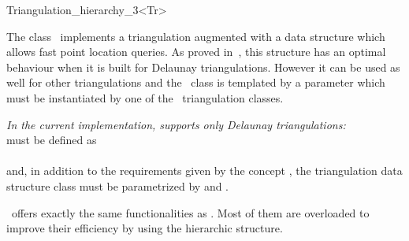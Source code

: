 

\begin{ccRefClass}{Triangulation_hierarchy_3<Tr>}

\ccDefinition
The class \ccRefName\ implements a triangulation augmented with
a data structure which allows fast point location queries.
As proved in~\cite{d-iirdt-98}, this structure has an optimal behaviour
when it is built for Delaunay triangulations.
However it can be used as well for other triangulations
and the \ccRefName\ class is templated by a parameter
which must be instantiated by one of the \cgal\ triangulation
classes.

\textit{In the current implementation,  
supports only Delaunay triangulations:}\\
 must be defined as\\
\\
and, in addition to the requirements given by the concept
, the triangulation data structure
class must be parametrized by 
and .


\ccInheritsFrom


\ccRefName\ offers exactly the same functionalities as .
Most of them are overloaded to improve their efficiency by using the
hierarchic structure. 





\end{ccRefClass}
